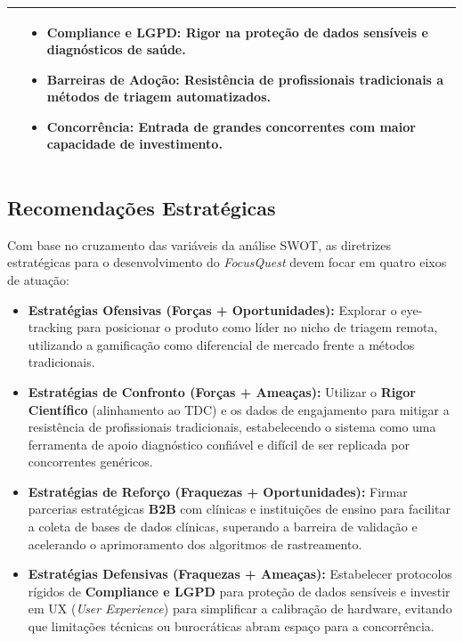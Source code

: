 \documentclass[11pt,a4paper]{article}
\begin{document}
\begin{table}[H]
\begin{tabular}{|p{7.2cm}|p{7.2cm}|}
\begin{minipage}[t]{7cm}
\begin{itemize}[leftmargin=*]
\end{itemize}
\end{minipage}
&
\begin{minipage}[t]{7cm}
\begin{itemize}[leftmargin=*]
    \item \textbf{Compliance e LGPD:} Rigor na proteção de dados sensíveis e diagnósticos de saúde.
    \item \textbf{Barreiras de Adoção:} Resistência de profissionais tradicionais a métodos de triagem automatizados.
    \item \textbf{Concorrência:} Entrada de grandes concorrentes com maior capacidade de investimento.
\end{itemize}
\end{minipage}
\\
\hline
\end{tabular}
\end{table}


\subsection{Recomendações Estratégicas}

Com base no cruzamento das variáveis da análise SWOT, as diretrizes estratégicas para o desenvolvimento do \textit{FocusQuest} devem focar em quatro eixos de atuação:

\begin{itemize}
    \item \textbf{Estratégias Ofensivas (Forças + Oportunidades):} Explorar o eye-tracking para posicionar o produto como líder no nicho de triagem remota, utilizando a gamificação como diferencial de mercado frente a métodos tradicionais.
    
    \item \textbf{Estratégias de Confronto (Forças + Ameaças):} Utilizar o \textbf{Rigor Científico} (alinhamento ao TDC) e os dados de engajamento para mitigar a resistência de profissionais tradicionais, estabelecendo o sistema como uma ferramenta de apoio diagnóstico confiável e difícil de ser replicada por concorrentes genéricos.
    
    \item \textbf{Estratégias de Reforço (Fraquezas + Oportunidades):} Firmar parcerias estratégicas \textbf{B2B} com clínicas e instituições de ensino para facilitar a coleta de bases de dados clínicas, superando a barreira de validação e acelerando o aprimoramento dos algoritmos de rastreamento.
    
    \item \textbf{Estratégias Defensivas (Fraquezas + Ameaças):} Estabelecer protocolos rígidos de \textbf{Compliance e LGPD} para proteção de dados sensíveis e investir em UX (\textit{User Experience}) para simplificar a calibração de hardware, evitando que limitações técnicas ou burocráticas abram espaço para a concorrência.
\end{itemize}
\end{document}

